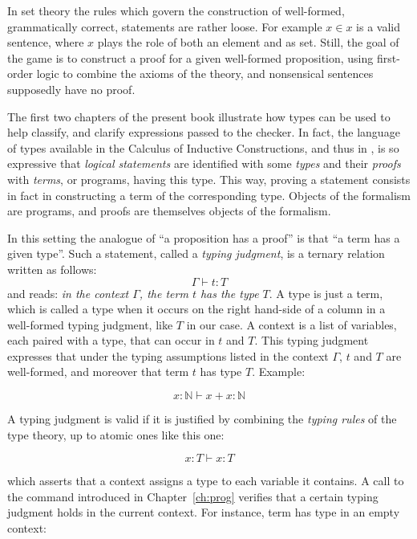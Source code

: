 In set theory the rules which govern the construction of
well-formed, grammatically correct, statements are rather loose.
For example
$x \in x$ is a valid sentence, where $x$ plays the role of
both an element and as set. Still, the
goal of the game is to construct a proof for a given well-formed
proposition, using first-order logic to combine the axioms of the
theory, and nonsensical sentences supposedly have no proof.

The first two chapters of the present book illustrate how
types can be used to help classify, and clarify expressions passed to
the checker. In fact, the language of types available in the Calculus
of Inductive Constructions, and thus in  \Coq{}, is so expressive that
\emph{logical statements} are identified with some \emph{types} and
their \emph{proofs} with \emph{terms}, or programs, having this
type. This way, proving a statement consists in fact in constructing a
term of the corresponding type. Objects of the formalism are programs,
and proofs are themselves objects of the formalism.

In this setting the analogue of ``a proposition has a proof''
is that ``a term has a given type''. Such a statement, called a
\emph{typing judgment}, is a ternary relation written as follows:
$$\Gamma \vdash t : T$$
and reads:
\emph{in the context $\Gamma$, the term $t$ has the type $T$}. A type
is just a term, which is called a type when it occurs on the right
hand-side of a column in a well-formed typing judgment, like $T$ in
our case. A context is a list of variables, each paired with a type,
that can occur in $t$ and $T$. This typing judgment expresses that
under the typing assumptions listed in the context $\Gamma$, $t$ and
$T$ are well-formed, and moreover that term $t$ has type $T$. Example:

$$x : \mathbb{N} \vdash x + x : \mathbb{N}$$

A typing judgment is valid if it is justified by combining the \emph{typing rules} of the
type theory, up to atomic ones like this one:

$$x : T \vdash x : T$$

which asserts that a context assigns a type to each variable it contains.
A call to the  command introduced in Chapter~\ref{ch:prog} 
verifies that a certain typing judgment holds in the current
context. For instance, term  has type  in an empty context:

